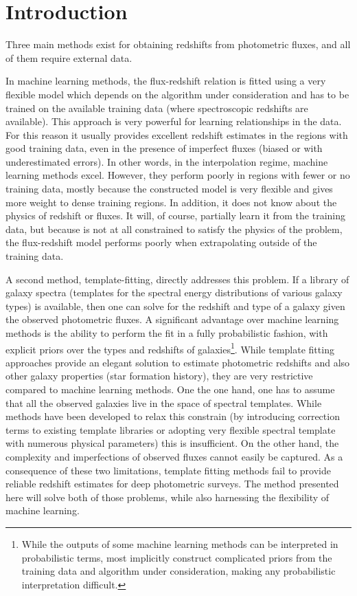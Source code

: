 \documentclass[aps,prd,showpacs,superscriptaddress,groupedaddress]{revtex4}  %
\begin{document}
\section{Introduction}

Three main methods exist for obtaining redshifts from photometric fluxes, and all of them require external data.

In machine learning methods, the flux-redshift relation is fitted using a very flexible model which depends on the algorithm under consideration and has to be trained on the available training data (where spectroscopic redshifts are available).
This approach is very powerful for learning relationships in the data.
For this reason it usually provides excellent redshift estimates in the regions with good training data, even in the presence of imperfect fluxes (\ie biased or with underestimated errors).
In other words, in the interpolation regime, machine learning methods excel.
However, they perform poorly in regions with fewer or no training data, mostly because the constructed model is very flexible and gives more weight to dense training regions.
In addition, it does not know about the physics of redshift or fluxes. 
It will, of course, partially learn it from the training data, but because is not at all constrained to satisfy the physics of the problem, the flux-redshift model performs poorly when extrapolating outside of the training data.

A second method, template-fitting, directly addresses this problem. If a library of galaxy spectra (\ie templates for the spectral energy distributions of various galaxy types) is available, then one can solve for the redshift and type of a galaxy given the observed photometric fluxes.
A significant advantage over machine learning methods is the ability to perform the fit in a fully probabilistic fashion, with explicit priors over the types and redshifts of galaxies\footnote{While the outputs of some machine learning methods can be interpreted in probabilistic terms, most implicitly construct complicated priors from the training data and algorithm under consideration, making any probabilistic interpretation difficult.}.
While template fitting approaches provide an elegant solution to estimate photometric redshifts and also other galaxy properties (\eg star formation history), they are very restrictive compared to machine learning methods.
One the one hand, one has to assume that all the observed galaxies live in the space of spectral templates. 
While methods have been developed to relax this constrain (\eg by introducing correction terms to existing template libraries or adopting very flexible spectral template with numerous physical parameters) this is insufficient.
On the other hand, the complexity and imperfections of observed fluxes cannot easily be captured.
As a consequence of these two limitations, template fitting methods fail to provide reliable redshift estimates for deep photometric surveys.
The method presented here will solve both of those problems, while also harnessing the flexibility of machine learning.
\end{document}
